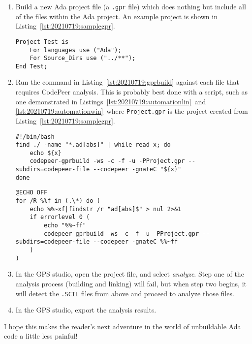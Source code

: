 \begin{enumerate}
	\item Build a new Ada project file (a \texttt{.gpr} file) which does nothing but include all of the files within the Ada project. An example project is shown in Listing~\ref{lst:20210719:samplegpr}.
\begin{lstlisting}[caption={All-Inclusive GPR Example},captionpos=b,style=AdaStyle,basicstyle=\small,label={lst:20210719:samplegpr},literate=*{-}{-}1,breaklines=true,upquote=true]
Project Test is
	For languages use ("Ada");
	For Source_Dirs use ("../**");
End Test;
\end{lstlisting}
	\item Run the command in Listing~\ref{lst:20210719:gprbuild} against each file that requires CodePeer analysis. This is probably best done with a script, such as one demonstrated in Listings~\ref{lst:20210719:automationlin}\ and \ref{lst:20210719:automationwin}\ where \texttt{Project.gpr} is the project created from Listing~\ref{lst:20210719:samplegpr}.
\begin{lstlisting}[caption={Bash Script for Ada Single-Build Automation},captionpos=b,style=BashStyle,basicstyle=\small,label={lst:20210719:automationlin},literate=*{-}{-}1
{"}{"}1,breaklines=true]
#!/bin/bash
find ./ -name "*.ad[abs]" | while read x; do
	echo ${x}
	codepeer-gprbuild -ws -c -f -u -PProject.gpr --subdirs=codepeer-file --codepeer -gnateC "${x}"
done
\end{lstlisting}
\begin{lstlisting}[caption={Batch Script for Ada Single-Build Automation},captionpos=b,style=BashStyle,basicstyle=\small,label={lst:20210719:automationwin},literate=*{-}{-}1
{"}{"}1,breaklines=true]
@ECHO OFF
for /R %%f in (.\*) do (
	echo %%~xf|findstr /r "ad[abs]$" > nul 2>&1
	if errorlevel 0 (
		echo "%%~ff"
		codepeer-gprbuild -ws -c -f -u -PProject.gpr --subdirs=codepeer-file --codepeer -gnateC %%~ff
	)
)
\end{lstlisting}
	\item In the GPS studio, open the project file, and select \textit{analyze}.  Step one of the analysis process (building and linking) will fail, but when step two begins, it will detect the \texttt{.SCIL} files from above and proceed to analyze those files.
	\item In the GPS studio, export the analysis results.
\end{enumerate}

I hope this makes the reader’s next adventure in the world of unbuildable Ada code a little less painful!
